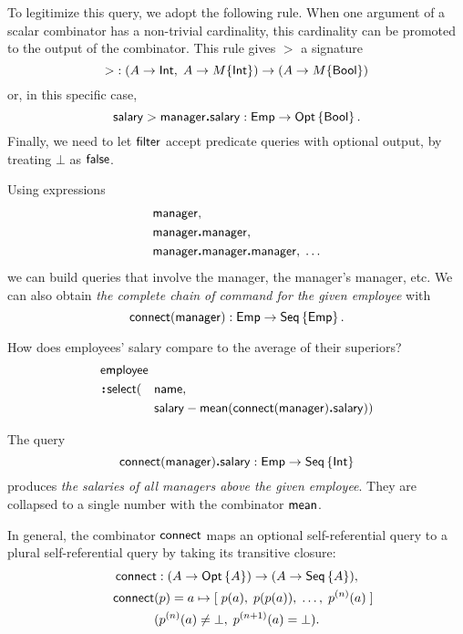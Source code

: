 To legitimize this query, we adopt the following rule.  When one argument of a
scalar combinator has a non-trivial cardinality, this cardinality can be
promoted to the output of the combinator.  This rule gives ${>}$ a signature
\begin{equation*}
    {>} : (A \to \textup{\textsf{Int}},\; A \to M\{\textup{\textsf{Int}}\}) \to (A \to M\{\textup{\textsf{Bool}}\})
\end{equation*}
or, in this specific case,
\begin{equation*}
    \textup{\textsf{salary}} > \textup{\textsf{manager}}\boldsymbol{.}\textup{\textsf{salary}} : \textup{\textsf{Emp}} \to \textup{\textsf{Opt}}\left\{\textup{\textsf{Bool}}\right\}.
\end{equation*}
Finally, we need to let $\textup{\textsf{filter}}$ accept predicate queries with optional
output, by treating $\bot$ as $\textup{\textsf{false}}$.

Using expressions
\begin{align*}
    & \textup{\textsf{manager}}, \\
    & \textup{\textsf{manager}}\boldsymbol{.}\textup{\textsf{manager}}, \\
    & \textup{\textsf{manager}}\boldsymbol{.}\textup{\textsf{manager}}\boldsymbol{.}\textup{\textsf{manager}},\; \ldots
\end{align*}
we can build queries that involve the manager, the manager's manager, etc.  We
can also obtain \emph{the complete chain of command for the given employee}
with
\begin{equation*}
    \textup{\textsf{connect}}(\textup{\textsf{manager}}) : \textup{\textsf{Emp}} \to \textup{\textsf{Seq}}\left\{\textup{\textsf{Emp}}\right\}.
\end{equation*}

\begin{demo}
    \label{ex:employee-salary-vs-superior}
    How does employees' salary compare to the average of their superiors?
    \begin{alignat*}{2}
        & \Employee\hidewidth && \\
        & \Apply\Select(&& \Name, \\
        & && \Salary-\Mean(\Connect(\Manager)\To\Salary))
    \end{alignat*}
\end{demo}

The query
\begin{equation*}
    \textup{\textsf{connect}}(\textup{\textsf{manager}})\boldsymbol{.}\textup{\textsf{salary}} : \textup{\textsf{Emp}} \to \textup{\textsf{Seq}}\left\{\textup{\textsf{Int}}\right\}
\end{equation*}
produces \emph{the salaries of all managers above the given employee}.  They
are collapsed to a single number with the combinator $\textup{\textsf{mean}}$.

In general, the combinator $\textup{\textsf{connect}}$ maps an optional self-referential query to a
plural self-referential query by taking its transitive closure:
\begin{multline*}
    \Connect : (A \to \Opt{A}) \to (A \to \Seq{A}), \\
    \shoveleft{\Connect(p) = a \mapsto [\;p(a),\; p(p(a)),\; \ldots,\; p^{(n)}(a)\;]} \\
    (p^{(n)}(a) \ne \bot,\; p^{(n+1)}(a) = \bot).
\end{multline*}



